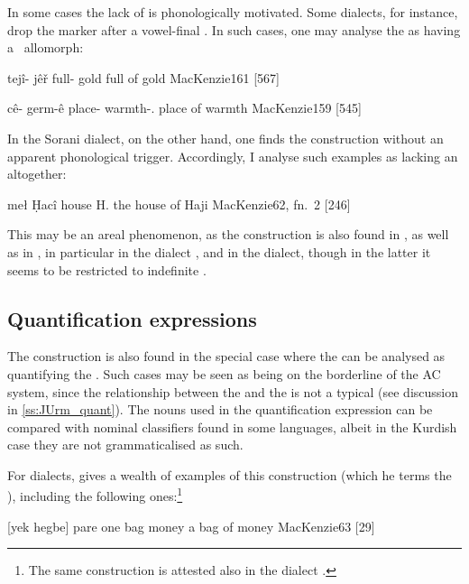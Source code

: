 In some cases the lack of \ez* is phonologically motivated. Some \Kur dialects, for instance, drop the \ez* marker after a vowel-final \prim. In such cases, one may analyse the \ez* as having a \zero\ allomorph:


{tejî-\zero{} jêř}
{full-\ez{} gold}
{full of gold}
{MacKenzie}{161 {[567]}}

{cê-\zero{} germ-ê}
{place-\ez{} warmth-\obl.\fem}
{place of warmth}
{MacKenzie}{159 {[545]}}

In the Sorani \War dialect, on the other hand, one finds the  construction without an apparent phonological trigger. Accordingly, I analyse such examples as lacking an \ez* altogether:


{meł Ḥacî}
{house H.}
{the house of Haji}
{MacKenzie}{62, fn.\ 2 {[246]}}

\newpage
This may be an areal phenomenon, as the  construction is also found in \Per \citep[209]{BalayEsmaili}, as well as in , in particular in the \Gawr dialect \citep[16]{MahmoudveysiGawraju}, and in the \Hawr dialect, though in the latter it seems to be restricted to indefinite \prims \citep[130--131]{HolmbergOdden}.

\subsection{Quantification expressions} \label{ss:kurd_quant}

The  construction is also found in the special case where the \prim can be analysed as quantifying the \secn. Such cases may be seen as being on the borderline of the AC system, since the relationship between the \prim and the \secn is not a typical  (see discussion in \ref{ss:JUrm_quant}). The nouns used in the quantification expression can be compared with nominal classifiers found in some languages, albeit in the Kurdish case they are not grammaticalised as such.

For \Sor dialects, \citet[63, \S 184.(c)]{MacKenzie} gives a wealth of examples of this construction (which he terms the ), including the following ones:\footnote{The same construction is attested also in the  \Hawr dialect \citep[20]{MacKenzieHawrami}.}


{[yek hegbe] pare}
{one bag money}
{a bag of money}
{MacKenzie}{63 {[29]}}

